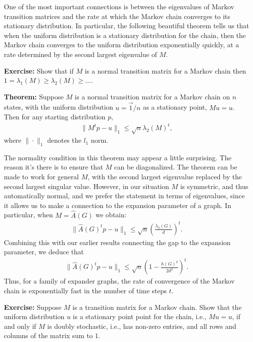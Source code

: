 \documentclass[12pt]{article}
\begin{document}
One of the most important connections is between the eigenvalues of
Markov transition matrices and the rate at which the Markov chain
converges to its stationary distribution.  In particular, the
following beautiful theorem tells us that when the uniform
distribution is a stationary distribution for the chain, then the
Markov chain converges to the uniform distribution exponentially
quickly, at a rate determined by the second largest eigenvalue of $M$.

\textbf{Exercise:} Show that if $M$ is a normal transition matrix for
a Markov chain then $1 = \lambda_1(M) \geq \lambda_2(M) \geq \ldots$.

\textbf{Theorem:} Suppose $M$ is a normal transition matrix for a
Markov chain on $n$ states, with the uniform distribution $u = \vec
1/n$ as a stationary point, $M u = u$.  Then for any starting
distribution $p$,
\begin{eqnarray}
  \| M^t p - u \|_1 \leq \sqrt{n} \lambda_2(M)^t,
\end{eqnarray}
where $\| \cdot \|_1$ denotes the $l_1$ norm.

The normality condition in this theorem may appear a little
surprising.  The reason it's there is to ensure that $M$ can be
diagonalized.  The theorem can be made to work for general $M$, with
the second largest eigenvalue replaced by the second largest singular
value.  However, in our situation $M$ is symmetric, and thus
automatically normal, and we prefer the statement in terms of
eigenvalues, since it allows us to make a connection to the expansion
parameter of a graph.  In particular, when $M = \hat A(G)$ we obtain:
\begin{eqnarray}
  \| \hat A(G)^t p-u\|_1 \leq \sqrt{n} \left(\frac{\lambda_2(G)}{d}\right)^t.
\end{eqnarray}
Combining this with our earlier results connecting the gap to the
expansion parameter, we deduce that
\begin{eqnarray}
  \| \hat A(G)^t p-u\|_1 \leq \sqrt{n} \left(1-\frac{h(G)^2}{2d^2}\right)^t.
\end{eqnarray}
Thus, for a family of expander graphs, the rate of convergence of the
Markov chain is exponentially fast in the number of time steps $t$.

\textbf{Exercise:} Suppose $M$ is a transition matrix for a Markov
chain.  Show that the uniform distribution $u$ is a stationary point
point for the chain, i.e., $Mu = u$, if and only if $M$ is doubly
stochastic, i.e., has non-zero entries, and all rows and columns of
the matrix sum to $1$.
\end{document}
